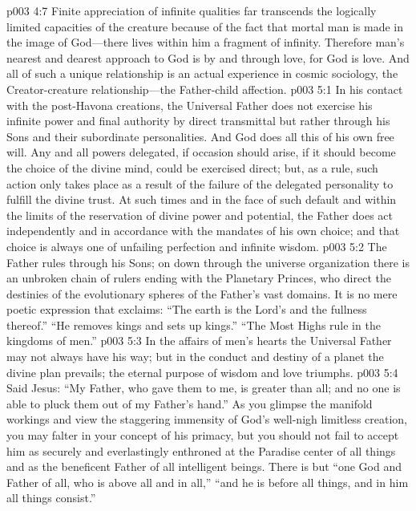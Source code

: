 \vs p003 4:7 Finite appreciation of infinite qualities far transcends the logically limited capacities of the creature because of the fact that mortal man is made in the image of God---there lives within him a fragment of infinity. Therefore man’s nearest and dearest approach to God is by and through love, for God is love. And all of such a unique relationship is an actual experience in cosmic sociology, the Creator\hyp{}creature relationship---the Father\hyp{}child affection.
\vs p003 5:1 In his contact with the post\hyp{}Havona creations, the Universal Father does not exercise his infinite power and final authority by direct transmittal but rather through his Sons and their subordinate personalities. And God does all this of his own free will. Any and all powers delegated, if occasion should arise, if it should become the choice of the divine mind, could be exercised direct; but, as a rule, such action only takes place as a result of the failure of the delegated personality to fulfill the divine trust. At such times and in the face of such default and within the limits of the reservation of divine power and potential, the Father does act independently and in accordance with the mandates of his own choice; and that choice is always one of unfailing perfection and infinite wisdom.
\vs p003 5:2 The Father rules through his Sons; on down through the universe organization there is an unbroken chain of rulers ending with the Planetary Princes, who direct the destinies of the evolutionary spheres of the Father’s vast domains. It is no mere poetic expression that exclaims: “The earth is the Lord’s and the fullness thereof.” “He removes kings and sets up kings.” “The Most Highs rule in the kingdoms of men.”
\vs p003 5:3 In the affairs of men’s hearts the Universal Father may not always have his way; but in the conduct and destiny of a planet the divine plan prevails; the eternal purpose of wisdom and love triumphs.
\vs p003 5:4 Said Jesus: \textcolor{ubdarkred}{“My Father, who gave them to me, is greater than all; and no one is able to pluck them out of my Father’s hand.”} As you glimpse the manifold workings and view the staggering immensity of God’s well\hyp{}nigh limitless creation, you may falter in your concept of his primacy, but you should not fail to accept him as securely and everlastingly enthroned at the Paradise center of all things and as the beneficent Father of all intelligent beings. There is but “one God and Father of all, who is above all and in all,” “and he is before all things, and in him all things consist.”
